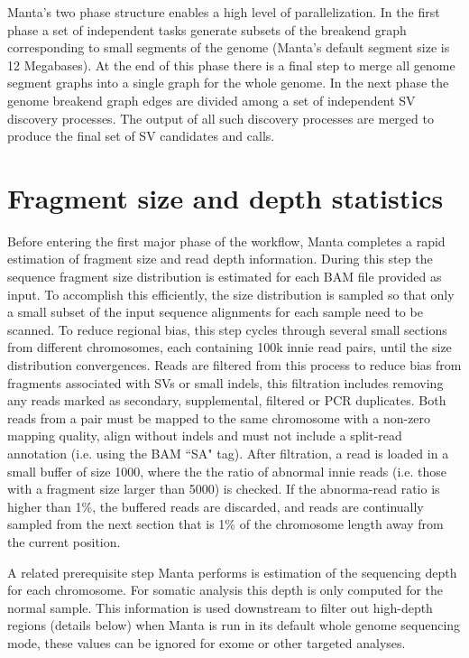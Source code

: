 \documentclass{article}
\begin{document}
Manta's two phase structure enables a high level of parallelization. In the first phase a set of independent tasks generate subsets of the breakend graph corresponding to small segments of the genome (Manta's default segment size is 12 Megabases). At the end of this phase there is a final step to merge all genome segment graphs into a single graph for the whole genome. In the next phase the genome breakend graph edges are divided among a set of independent SV discovery processes. The output of all such discovery processes are merged to produce the final set of SV candidates and calls.

\section{Fragment size and depth statistics}

Before entering the first major phase of the workflow, Manta completes a rapid estimation of fragment size and read depth information. During this step the sequence fragment size distribution is estimated for each BAM file provided as input. To accomplish this efficiently, the size distribution is sampled so that only a small subset of the input sequence alignments for each sample need to be scanned. To reduce regional bias, this step cycles through several small sections from different chromosomes, each containing 100k innie read pairs, until the size distribution convergences. Reads are filtered from this process to reduce bias from fragments associated with SVs or small indels, this filtration includes removing any reads marked as secondary, supplemental, filtered or PCR duplicates. Both reads from a pair must be mapped to the same chromosome with a non-zero mapping quality, align without indels and must not include a split-read annotation (i.e. using the BAM ``SA" tag). After filtration, a read is loaded in a small buffer of size 1000, where the the ratio of abnormal innie reads (i.e. those with a fragment size larger than 5000) is checked. If the abnorma-read ratio is higher than 1\%, the buffered reads are discarded, and reads are continually sampled from the next section that is 1\% of the chromosome length away from the current position.

A related prerequisite step Manta performs is estimation of the sequencing depth for each chromosome. For somatic analysis this depth is only computed for the normal sample. This information is used downstream to filter out high-depth regions (details below) when Manta is run in its default whole genome sequencing mode, these values can be ignored for exome or other targeted analyses.
\end{document}
